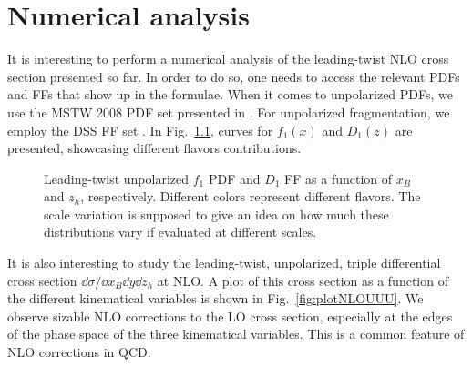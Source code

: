 
\chapter{Numerical analysis}
It is interesting to perform a numerical analysis of the leading-twist NLO cross section presented so far. In order to do so, one needs to access the relevant PDFs and FFs that show up in the formulae. When it comes to unpolarized PDFs, we use the MSTW 2008 PDF set presented in \cite{Martin2009}. For unpolarized fragmentation, we employ the DSS FF set \cite{deFlorian2007}. In Fig.~\ref{fig:f1D1}, curves for $f_1(x)$ and $D_1(z)$ are presented, showcasing different flavors contributions.
\begin{figure}
    \centering
    \hfill
    \caption{Leading-twist unpolarized $f_1$ PDF and $D_1$ FF as a function of $x_B$ and $z_h$, respectively. Different colors represent different flavors. The scale variation is supposed to give an idea on how much these distributions vary if evaluated at different scales.}
    \label{fig:f1D1}
\end{figure}
It is also interesting to study the leading-twist, unpolarized, triple differential cross section $\dd \sigma/\dd x_B \dd y \dd z_h$ at NLO. A plot of this cross section as a function of the different kinematical variables is shown in Fig.~\ref{fig:plotNLOUUU}. We observe sizable NLO corrections to the LO cross section, especially at the edges of the phase space of the three kinematical variables. This is a common feature of NLO corrections in QCD.
